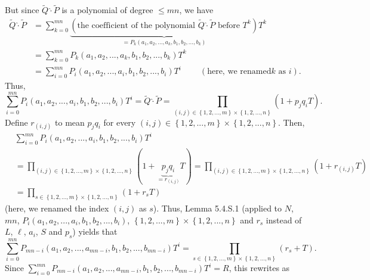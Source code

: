 \documentclass[numbers=enddot,12pt,final,onecolumn,notitlepage]{scrartcl}%
\begin{document}
But since $\widetilde{Q}\widehat{\cdot}\widetilde{P}$ is a polynomial of
degree $\leq mn$, we have%
\begin{align*}
\widetilde{Q}\widehat{\cdot}\widetilde{P}  &  =\sum_{k=0}^{mn}%
\underbrace{\left(  \text{the coefficient of the polynomial }\widetilde{Q}%
\widehat{\cdot}\widetilde{P}\text{ before }T^{k}\right)  }_{=P_{k}\left(
a_{1},a_{2},...,a_{k},b_{1},b_{2},...,b_{k}\right)  }T^{k}\\
&  =\sum_{k=0}^{mn}P_{k}\left(  a_{1},a_{2},...,a_{k},b_{1},b_{2}%
,...,b_{k}\right)  T^{k}\\
&  =\sum_{i=0}^{mn}P_{i}\left(  a_{1},a_{2},...,a_{i},b_{1},b_{2}%
,...,b_{i}\right)  T^{i}\ \ \ \ \ \ \ \ \ \ \left(  \text{here, we renamed
}k\text{ as }i\right)  .
\end{align*}
Thus,%
\[
\sum_{i=0}^{mn}P_{i}\left(  a_{1},a_{2},...,a_{i},b_{1},b_{2},...,b_{i}%
\right)  T^{i}=\widetilde{Q}\widehat{\cdot}\widetilde{P}=\prod\limits_{\left(
i,j\right)  \in\left\{  1,2,...,m\right\}  \times\left\{  1,2,...,n\right\}
}\left(  1+p_{j}q_{i}T\right)  .
\]
Define $r_{\left(  i,j\right)  }$ to mean $p_{j}q_{i}$ for every $\left(
i,j\right)  \in\left\{  1,2,...,m\right\}  \times\left\{  1,2,...,n\right\}
$. Then,%
\begin{align*}
&  \sum_{i=0}^{mn}P_{i}\left(  a_{1},a_{2},...,a_{i},b_{1},b_{2}%
,...,b_{i}\right)  T^{i}\\
&  =\prod\limits_{\left(  i,j\right)  \in\left\{  1,2,...,m\right\}
\times\left\{  1,2,...,n\right\}  }\left(  1+\underbrace{p_{j}q_{i}%
}_{=r_{\left(  i,j\right)  }}T\right)  =\prod\limits_{\left(  i,j\right)
\in\left\{  1,2,...,m\right\}  \times\left\{  1,2,...,n\right\}  }\left(
1+r_{\left(  i,j\right)  }T\right) \\
&  =\prod\limits_{s\in\left\{  1,2,...,m\right\}  \times\left\{
1,2,...,n\right\}  }\left(  1+r_{s}T\right)
\end{align*}
(here, we renamed the index $\left(  i,j\right)  $ as $s$). Thus, Lemma
5.4.S.1 (applied to $N$, $mn$, $P_{i}\left(  a_{1},a_{2},...,a_{i},b_{1}%
,b_{2},...,b_{i}\right)  $, $\left\{  1,2,...,m\right\}  \times\left\{
1,2,...,n\right\}  $ and $r_{s}$ instead of $L$, $\ell$, $a_{i}$, $S$ and
$p_{s}$) yields that%
\[
\sum\limits_{i=0}^{mn}P_{mn-i}\left(  a_{1},a_{2},...,a_{mn-i},b_{1}%
,b_{2},...,b_{mn-i}\right)  T^{i}=\prod\limits_{s\in\left\{
1,2,...,m\right\}  \times\left\{  1,2,...,n\right\}  }\left(  r_{s}+T\right)
.
\]
Since $\sum\limits_{i=0}^{mn}P_{mn-i}\left(  a_{1},a_{2},...,a_{mn-i}%
,b_{1},b_{2},...,b_{mn-i}\right)  T^{i}=R$, this rewrites as%
\end{document}
